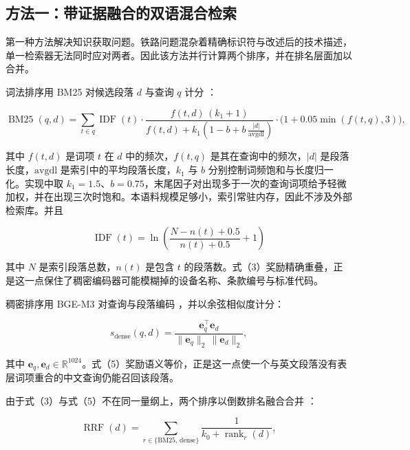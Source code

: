 \documentclass{article}
\DeclareMathOperator{\rank}{rank}
\begin{document}
\subsection{方法一：带证据融合的双语混合检索}

第一种方法解决知识获取问题。铁路问题混杂着精确标识符与改述后的技术描述，单一检索器无法同时应对两者。因此该方法并行计算两个排序，并在排名层面加以合并。

词法排序用 BM25 对候选段落 $d$ 与查询 $q$ 计分 \citep{robertson2009bm25}：

\begin{equation}
\operatorname{BM25}(q,d)=\sum_{t\in q}\operatorname{IDF}(t)\cdot
\frac{f(t,d)\,(k_1+1)}{f(t,d)+k_1\left(1-b+b\,\frac{|d|}{\mathrm{avgdl}}\right)}
\cdot\bigl(1+0.05\min\!\left(f(t,q),3\right)\bigr),
\end{equation}

其中 $f(t,d)$ 是词项 $t$ 在 $d$ 中的频次，$f(t,q)$ 是其在查询中的频次，$|d|$ 是段落长度，$\mathrm{avgdl}$ 是索引中的平均段落长度，$k_1$ 与 $b$ 分别控制词频饱和与长度归一化。实现中取 $k_1=1.5$、$b=0.75$，末尾因子对出现多于一次的查询词项给予轻微加权，并在出现三次时饱和。本语料规模足够小，索引常驻内存，因此不涉及外部检索库。并且

\begin{equation}
\operatorname{IDF}(t)=\ln\!\left(\frac{N-n(t)+0.5}{n(t)+0.5}+1\right)
\end{equation}

其中 $N$ 是索引段落总数，$n(t)$ 是包含 $t$ 的段落数。式（3）奖励精确重叠，正是这一点保住了稠密编码器可能模糊掉的设备名称、条款编号与标准代码。

稠密排序用 BGE-M3 对查询与段落编码 \citep{chen2024bgem3}，并以余弦相似度计分：

\begin{equation}
s_{\mathrm{dense}}(q,d)=\frac{\mathbf{e}_q^{\top}\mathbf{e}_d}{\lVert\mathbf{e}_q\rVert_2\,\lVert\mathbf{e}_d\rVert_2},
\end{equation}

其中 $\mathbf{e}_q,\mathbf{e}_d\in\mathbb{R}^{1024}$。式（5）奖励语义等价，正是这一点使一个与英文段落没有表层词项重合的中文查询仍能召回该段落。

由于式（3）与式（5）不在同一量纲上，两个排序以倒数排名融合合并 \citep{cormack2009rrf}：

\begin{equation}
\operatorname{RRF}(d)=\sum_{r\in\{\mathrm{BM25},\,\mathrm{dense}\}}\frac{1}{k_0+\rank_r(d)},
\end{equation}
\end{document}
